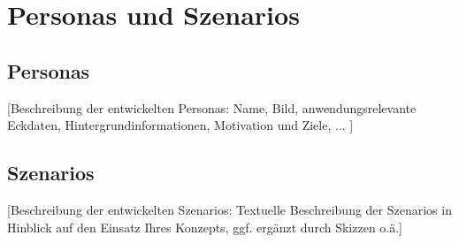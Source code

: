 \section{Personas und Szenarios}

\subsection{Personas}

[Beschreibung der entwickelten Personas: Name, Bild, anwendungsrelevante Eckdaten, Hintergrundinformationen, Motivation und Ziele, ... ]

\subsection{Szenarios}

[Beschreibung der entwickelten Szenarios: Textuelle Beschreibung der Szenarios in Hinblick auf den Einsatz Ihres Konzepts, ggf. ergänzt durch Skizzen o.ä.]
